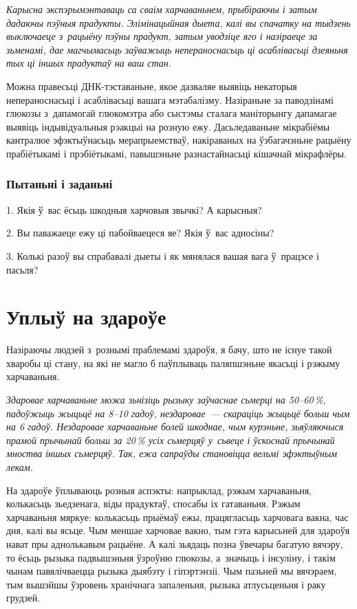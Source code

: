 \emph{Карысна экспэрымэнтаваць са сваім харчаваньнем, прыбіраючы і затым дадаючы пэўныя прадукты. Элімінацыйная дыета, калі вы спачатку на тыдзень выключаеце з~рацыёну пэўны прадукт, затым уводзіце яго і назіраеце за зьменамі, дае магчымасьць заўважыць непераноснасьць ці асаблівасьці дзеяньня тых ці іншых прадуктаў на ваш стан.}

Можна правесьці ДНК-тэставаньне, якое дазваляе выявіць некаторыя непераноснасьці і асаблівасьці вашага мэтабалізму. Назіраньне за паводзінамі глюкозы з~дапамогай глюкомэтра або сыстэмы сталага маніторынгу дапамагае выявіць індывідуальныя рэакцыі на розную ежу. Дасьледаваньне мікрабіёмы кантралюе эфэктыўнасьць мерапрыемстваў, накіраваных на ўзбагачэньне рацыёну прабіётыкамі і прэбіётыкамі, павышэньне разнастайнасьці кішачнай мікрафлёры.

\subsubsection{Пытаньні і заданьні}

1. Якія ў~вас ёсьць шкодныя харчовыя звычкі? А карысныя?

2. Вы паважаеце ежу ці пабойваецеся яе? Якія ў~вас адносіны?

3. Колькі разоў вы спрабавалі дыеты і як мянялася вашая вага ў~працэсе і пасьля?


\section{Уплыў на здароўе}

Назіраючы людзей з~рознымі праблемамі здароўя, я бачу, што не існуе такой хваробы ці стану, на які не магло б паўплываць паляпшэньне якасьці і рэжыму харчаваньня. 

\emph{Здаровае харчаваньне можа зьнізіць рызыку заўчаснае сьмерці на 50--60\,\%, падоўжыць жыцьцё на 8--10 гадоў, нездаровае~--- скараціць жыцьцё больш чым на 6 гадоў. Нездаровае харчаваньне болей шкоднае, чым курэньне, зьяўляючыся прамой прычынай больш за 20\,\% усіх сьмерцяў у~сьвеце і ўскоснай прычынай мноства іншых сьмерцяў. Так, ежа сапраўды становіцца вельмі эфэктыўным лекам.} 


На здароўе ўплываюць розныя аспэкты: напрыклад, рэжым харчаваньня, колькасьць зьедзенага, віды прадуктаў, спосабы іх гатаваньня. Рэжым харчаваньня мяркуе: колькасьць прыёмаў ежы, працягласьць харчовага вакна, час дня, калі вы ясьце. Чым меншае харчовае вакно, тым гэта карысьней для здароўя нават пры аднолькавым рацыёне. А калі зьядаць позна ўвечары багатую вячэру, то ёсьць рызыка падвышэньня ўзроўню глюкозы, а~значыць і інсуліну, і такім чынам павялічваецца рызыка дыябэту і гіпэртэнзіі. Чым пазьней мы вячэраем, тым вышэйшы ўзровень хранічнага запаленьня, рызыка атлусьценьня і раку грудзей.

